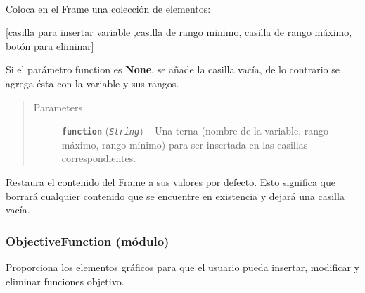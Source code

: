 \documentclass[letterpaper,10pt,english]{sphinxmanual}
\begin{document}
\begin{fulllineitems}
\begin{fulllineitems}
\label{View/Main/DecisionVariable/VariableFrame:View.Main.DecisionVariable.VariableFrame.VariableFrame.insert_variable}~
\begin{DUlineblock}{0em}
\item[] Coloca en el Frame una colección de elementos:
\item[] {[}casilla para insertar variable ,casilla de rango minimo, casilla de rango máximo, botón para eliminar{]}
\item[] Si el parámetro function es \textbf{None}, se añade la casilla vacía, de lo contrario se 
agrega ésta con la variable y sus rangos.
\end{DUlineblock}
\begin{quote}\begin{description}
\item[{Parameters}] \leavevmode
\textbf{\texttt{function}} (\emph{\texttt{String}}) -- Una terna (nombre de la variable, rango máximo, rango mínimo)
para ser insertada en las casillas correspondientes.

\end{description}\end{quote}

\end{fulllineitems}


\begin{fulllineitems}
\label{View/Main/DecisionVariable/VariableFrame:View.Main.DecisionVariable.VariableFrame.VariableFrame.restore_settings}
Restaura el contenido del Frame a sus valores por defecto.
Esto significa que borrará cualquier contenido que se encuentre en existencia y 
dejará una casilla vacía.

\end{fulllineitems}


\end{fulllineitems}



\subsubsection{ObjectiveFunction (módulo)}
\label{View/Main/ObjectiveFunction/ObjectiveFunction:objectivefunction-modulo}\label{View/Main/ObjectiveFunction/ObjectiveFunction::doc}
Proporciona los elementos gráficos para que el usuario
pueda insertar, modificar y eliminar funciones objetivo.
\end{document}
